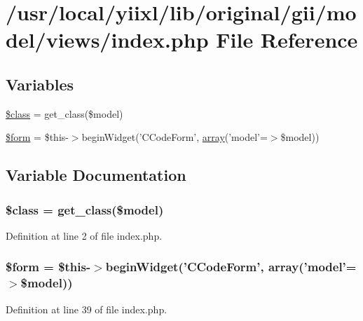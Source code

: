 \hypertarget{gii_2model_2views_2index_8php}{
\section{/usr/local/yiixl/lib/original/gii/model/views/index.php File Reference}
\label{gii_2model_2views_2index_8php}
}
\subsection*{Variables}
\begin{DoxyCompactItemize}
\item 
\hyperlink{gii_2model_2views_2index_8php_a252ba022809910ea710a068fc1bab657}{\$class} = get\_\-class(\$model)
\item 
\hyperlink{gii_2model_2views_2index_8php_a1a4fda4c28a9ee5f91102c023b9501f4}{\$form} = \$this-\/$>$beginWidget('CCodeForm', \hyperlink{list_8php_aa3205d038c7f8feb5c9f01ac4dfadc88}{array}('model'=$>$\$model))
\end{DoxyCompactItemize}


\subsection{Variable Documentation}
\hypertarget{gii_2model_2views_2index_8php_a252ba022809910ea710a068fc1bab657}{
\subsubsection[{\$class}]{\setlength{\rightskip}{0pt plus 5cm}\$class = get\_\-class(\$model)}}
\label{gii_2model_2views_2index_8php_a252ba022809910ea710a068fc1bab657}


Definition at line 2 of file index.php.

\hypertarget{gii_2model_2views_2index_8php_a1a4fda4c28a9ee5f91102c023b9501f4}{
\subsubsection[{\$form}]{\setlength{\rightskip}{0pt plus 5cm}\$form = \$this-\/$>$beginWidget('CCodeForm', {\bf array}('model'=$>$\$model))}}
\label{gii_2model_2views_2index_8php_a1a4fda4c28a9ee5f91102c023b9501f4}


Definition at line 39 of file index.php.

